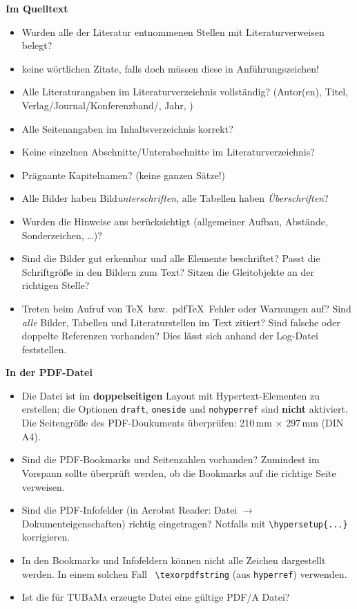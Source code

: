 \textbf{Im Quelltext}
\begin{itemize}
	\item Wurden alle der Literatur entnommenen Stellen mit Literaturverweisen belegt?
	\item keine wörtlichen Zitate, falls doch müssen diese in Anführungszeichen!
	\item Alle Literaturangaben im Literaturverzeichnis vollständig? (Autor(en), Titel, Verlag/Journal/Konferenzband/\etc, Jahr, \usw)
	\item Alle Seitenangaben im Inhaltsverzeichnis korrekt?
	\item Keine einzelnen Abschnitte/Unterabschnitte im Literaturverzeichnis?
	\item Prägnante Kapitelnamen? (keine ganzen Sätze!)
	\item Alle Bilder haben Bild\emph{unterschriften}, alle Tabellen haben \emph{Überschriften}?
	\item Wurden die Hinweise aus  berücksichtigt
	(allgemeiner Aufbau, Abstände, Sonderzeichen, \ldots)\vspace{.1em}?
	\item Sind die Bilder gut erkennbar und alle Elemente beschriftet\vspace{.1em}?
	Passt die Schriftgröße in den Bildern zum Text\vspace{.1em}? Sitzen die
	Gleitobjekte an der richtigen Stelle\vspace{.1em}?
	\item Treten beim Aufruf von \TeX\ bzw.\ pdf\TeX\ Fehler oder Warnungen
	auf\vspace{.1em}? Sind \emph{alle} Bilder, Tabellen und Literaturstellen im
	Text zitiert\vspace{.1em}? Sind falsche oder doppelte Referenzen
	vorhanden\vspace{.1em}? Dies lässt sich anhand der Log-Datei feststellen.
\end{itemize}

\textbf{In der PDF-Datei}
\begin{itemize}
	\item Die Datei ist im \textbf{doppelseitigen} Layout mit Hypertext-Elementen zu
	erstellen; die Optionen \verb|draft|, \verb|oneside| und \verb|nohyperref|
	sind \textbf{nicht} aktiviert. Die Seitengröße des PDF-Doukuments überprüfen:
	210\,mm $\times$ 297\,mm (DIN A4).
	\item Sind die PDF-Bookmarks und Seitenzahlen vorhanden\vspace{.1em}? Zumindest
	im Vorspann sollte überprüft werden, ob die Bookmarks auf die richtige Seite
	verweisen.
	\item Sind die PDF-Infofelder (in Acrobat Reader: Datei $\rightarrow$
	Dokumenteigenschaften) richtig eingetragen\vspace{.1em}? Notfalls mit
	\verb|\hypersetup{...}| korrigieren.
	\item In den Bookmarks und Infofeldern können nicht alle Zeichen dargestellt
	werden. In einem solchen Fall \zB\ \verb|\texorpdfstring| (aus
	\verb|hyperref|) verwenden.
	\item Ist die für \textsc{TUBaMa} erzeugte Datei eine gültige PDF/A Datei?
\end{itemize}

